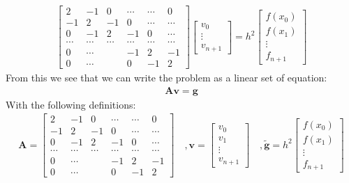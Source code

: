 \documentclass[american,a4paper,12pt]{article}
\renewcommand{\vec}[1]{\mathbf{#1}} %
\begin{document}
    \begin{align*}
          \begin{bmatrix}
            2 & -1 & 0 & \cdots & \cdots & 0 \\
            -1 & 2 & -1 & 0 & \cdots & \cdots \\
            0 & -1 & 2 & -1 & 0 & \cdots \\
            \cdots & \cdots & \cdots & \cdots & \cdots & \cdots \\
            0 & \cdots & & -1 & 2 & -1 \\
            0 & \cdots & & 0 & -1 & 2
          \end{bmatrix}
          \begin{bmatrix}
            v_0 \\
            \vdots \\
            v_{n+1}
          \end{bmatrix}
    = h^2
          \begin{bmatrix}
            f(x_0) \\
            f(x_1) \\
            \vdots \\
            f_{n+1}
          \end{bmatrix}
    \end{align*}
    From this we see that we can write the problem as a linear set of equation:
    \begin{align*}
      \vec{A}\vec{v} = \vec{g}
    \end{align*}
    With the following definitions:
    \begin{align*}
      \vec{A} =
      \begin{bmatrix}
        2 & -1 & 0 & \cdots & \cdots & 0 \\
        -1 & 2 & -1 & 0 & \cdots & \cdots \\
        0 & -1 & 2 & -1 & 0 & \cdots \\
        \cdots & \cdots & \cdots & \cdots & \cdots & \cdots \\
        0 & \cdots & & -1 & 2 & -1 \\
        0 & \cdots & & 0 & -1 & 2
      \end{bmatrix}
      \quad, \vec{v} =
      \begin{bmatrix}
        v_0 \\
        v_1 \\
        \vdots \\
        v_{n+1}
      \end{bmatrix}
      \quad, \vec{\tilde{g}} = h^2
      \begin{bmatrix}
        f(x_0) \\
        f(x_1) \\
        \vdots \\
        f_{n+1}
      \end{bmatrix}
    \end{align*}
\end{document}

